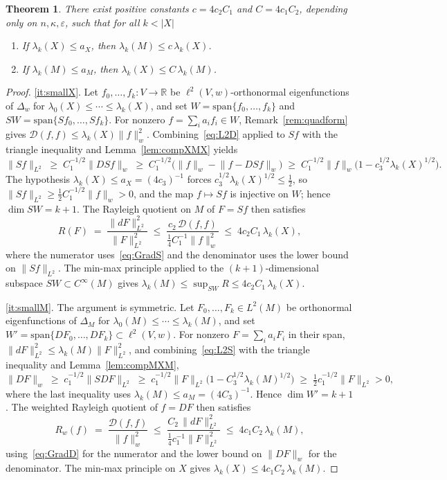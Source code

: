 \documentclass[10pt,reqno]{amsart}
\newtheorem{theorem}{Theorem}[section]
\theoremstyle{remark}
\newcommand{\R}{\mathbb{R}}
\newcommand{\normw}[1]{\lVert #1 \rVert_{w}}
\newcommand{\norml}[1]{\lVert #1 \rVert_{L^{2}}}
\newcommand{\DD}{\mathcal{D}}
\newcommand{\Rw}{R_{w}}
\begin{document}
\begin{theorem}
\label{thm:small}
There exist positive constants $c=4c_2C_1$ and $C=4c_1C_2$,
depending only on $n,\kappa,\varepsilon$, such that for all $k<|X|$
\begin{enumerate}[label=(\roman*)]
\item\label{it:smallX}
If $\lambda_k(X)\leq a_X$, then $\lambda_k(M)\leq c\,\lambda_k(X)$.
\item\label{it:smallM}
If $\lambda_k(M)\leq a_M$, then $\lambda_k(X)\leq C\,\lambda_k(M)$.
\end{enumerate}
\end{theorem}

\begin{proof}
\ref{it:smallX}.
Let $f_0,\ldots,f_k:V\to\R$ be $\ell^2(V,w)$-orthonormal eigenfunctions
of $\Delta_w$ for $\lambda_0(X)\leq\cdots\leq\lambda_k(X)$, and set
$W=\mathrm{span}\{f_0,\ldots,f_k\}$ and
$SW=\mathrm{span}\{Sf_0,\ldots,Sf_k\}$. For nonzero $f=\sum_i a_i f_i
\in W$, Remark~\ref{rem:quadform} gives
$\DD(f,f)\leq\lambda_k(X)\normw{f}^2$. Combining~\eqref{eq:L2D} applied
to $Sf$ with the triangle inequality and
Lemma~\ref{lem:compXMX} yields
\[
  \norml{Sf}
  \;\geq\;
  C_1^{-1/2}\normw{DSf}
  \;\geq\;
  C_1^{-1/2}\bigl(\normw{f}-\normw{f-DSf}\bigr)
  \;\geq\;
  C_1^{-1/2}\normw{f}\bigl(1-c_3^{1/2}\lambda_k(X)^{1/2}\bigr).
\]
The hypothesis $\lambda_k(X)\leq a_X=(4c_3)^{-1}$ forces
$c_3^{1/2}\lambda_k(X)^{1/2}\leq\frac{1}{2}$, so
$\norml{Sf}\geq\frac{1}{2}C_1^{-1/2}\normw{f}>0$, and the map $f\mapsto Sf$
is injective on $W$; hence $\dim SW=k+1$. The Rayleigh quotient on $M$
of $F=Sf$ then satisfies
\[
  R(F)
  \;=\;
  \frac{\norml{dF}^2}{\norml{F}^2}
  \;\leq\;
  \frac{c_2\,\DD(f,f)}{\frac{1}{4}C_1^{-1}\normw{f}^2}
  \;\leq\;
  4c_2C_1\,\lambda_k(X),
\]
where the numerator uses~\eqref{eq:GradS} and the denominator uses the
lower bound on $\norml{Sf}$. The min-max principle applied to the
$(k+1)$-dimensional subspace $SW\subset C^\infty(M)$ gives
$\lambda_k(M)\leq\sup_{SW}R\leq 4c_2C_1\,\lambda_k(X)$.

\ref{it:smallM}. The argument is symmetric. Let
$F_0,\ldots,F_k\in L^2(M)$ be orthonormal eigenfunctions of $\Delta_M$
for $\lambda_0(M)\leq\cdots\leq\lambda_k(M)$, and set
$W'=\mathrm{span}\{DF_0,\ldots,DF_k\}\subset\ell^2(V,w)$. For nonzero
$F=\sum_i a_i F_i$ in their span,
$\norml{dF}^2\leq\lambda_k(M)\norml{F}^2$, and
combining~\eqref{eq:L2S} with the triangle inequality and
Lemma~\ref{lem:compMXM},
\[
  \normw{DF}
  \;\geq\;
  c_1^{-1/2}\norml{SDF}
  \;\geq\;
  c_1^{-1/2}\norml{F}\bigl(1-C_3^{1/2}\lambda_k(M)^{1/2}\bigr)
  \;\geq\;
  \tfrac{1}{2}c_1^{-1/2}\norml{F}>0,
\]
where the last inequality uses $\lambda_k(M)\leq a_M=(4C_3)^{-1}$.
Hence $\dim W'=k+1$. The weighted Rayleigh quotient of $f=DF$ then
satisfies
\[
  \Rw(f)
  \;=\;
  \frac{\DD(f,f)}{\normw{f}^2}
  \;\leq\;
  \frac{C_2\,\norml{dF}^2}{\frac{1}{4}c_1^{-1}\norml{F}^2}
  \;\leq\;
  4c_1C_2\,\lambda_k(M),
\]
using~\eqref{eq:GradD} for the numerator and the lower bound on
$\normw{DF}$ for the denominator. The min-max principle on $X$ gives
$\lambda_k(X)\leq 4c_1C_2\,\lambda_k(M)$.
\end{proof}
\end{document}

